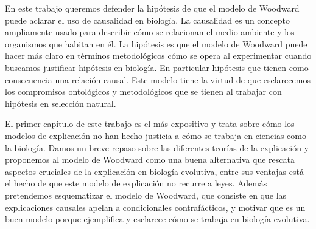 En este trabajo queremos defender la hipótesis de que el modelo de Woodward puede aclarar el uso de causalidad en biología. La causalidad es un concepto ampliamente usado para describir cómo se relacionan el medio ambiente y los organismos que habitan en él. La hipótesis es que el modelo de Woodward puede hacer más claro en términos metodológicos cómo se opera al experimentar cuando buscamos justificar hipótesis en biología. En particular hipótesis que tienen como consecuencia una relación causal. Este modelo tiene la virtud de que esclarecemos los compromisos ontológicos y metodológicos que se tienen al trabajar con hipótesis en selección natural.

El primer capítulo de este trabajo es el más expositivo y trata sobre cómo los modelos de explicación no han hecho justicia a cómo se trabaja en ciencias como la biología. Damos un breve repaso sobre las diferentes teorías de la explicación y proponemos al modelo de Woodward como una buena alternativa que rescata aspectos cruciales de la explicación en biología evolutiva, entre sus ventajas está el hecho de que este modelo de explicación no recurre a leyes. Además pretendemos esquematizar el modelo de Woodward, que consiste en que las explicaciones causales apelan a condicionales contrafácticos, y motivar que es un buen modelo porque ejemplifica y esclarece cómo se trabaja en biología evolutiva.

